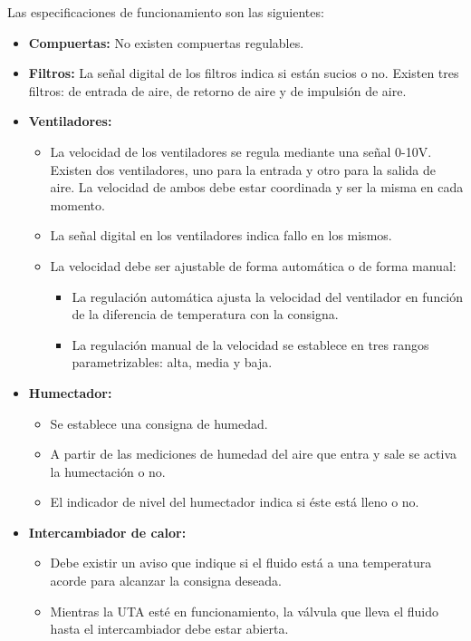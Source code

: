 Las especificaciones de funcionamiento son las siguientes:

\begin{itemize}
  \item \textbf{Compuertas:} No existen compuertas regulables.
  \item \textbf{Filtros:} La señal digital de los filtros indica si están sucios o no. Existen tres filtros: de entrada de aire, de retorno de aire y de impulsión de aire.
  \item \textbf{Ventiladores:} 
  \begin{itemize}
    \item La velocidad de los ventiladores se regula mediante una señal 0-10V. Existen dos ventiladores, uno para la entrada y otro para la salida de aire. La velocidad de ambos debe estar coordinada y ser la misma en cada momento.
    \item La señal digital en los ventiladores indica fallo en los mismos.
    \item La velocidad debe ser ajustable de forma automática o de forma manual:
    \begin{itemize}
      \item La regulación automática ajusta la velocidad del ventilador en función de la diferencia de temperatura con la consigna.
      \item La regulación manual de la velocidad se establece en tres rangos parametrizables: alta, media y baja.
    \end{itemize}
  \end{itemize} 
  \item \textbf{Humectador:} 
  \begin{itemize}
    \item Se establece una consigna de humedad.
    \item A partir de las mediciones de humedad del aire que entra y sale se activa la humectación o no.
    \item El indicador de nivel del humectador indica si éste está lleno o no.
  \end{itemize}
  \item \textbf{Intercambiador de calor:}
  \begin{itemize}
    \item Debe existir un aviso que indique si el fluido está a una temperatura acorde para alcanzar la consigna deseada.
    \item Mientras la UTA esté en funcionamiento, la válvula que lleva el fluido hasta el intercambiador debe estar abierta.

\end{itemize}
\end{itemize}
